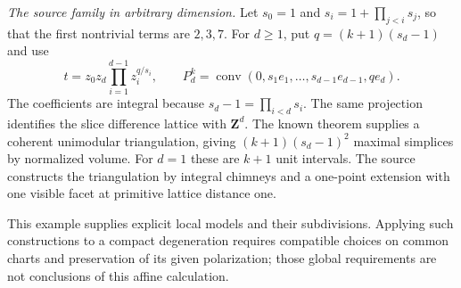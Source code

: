 \begin{example}
\emph{The source family in arbitrary dimension.}
Let $s_0=1$ and $s_i=1+\prod_{j<i}s_j$, so that the first nontrivial
terms are $2,3,7$. For $d\ge1$, put $q=(k+1)(s_d-1)$ and use
\[
          t=z_0z_d\prod_{i=1}^{d-1}z_i^{q/s_i},
 \qquad
 P_d^k=\operatorname{conv}
   (0,s_1e_1,\ldots,s_{d-1}e_{d-1},qe_d).
\]
The coefficients are integral because $s_d-1=\prod_{i<d}s_i$.
The same projection identifies the slice difference lattice with
$\mathbf Z^d$. The known theorem supplies a coherent unimodular
triangulation, giving $(k+1)(s_d-1)^2$ maximal simplices by normalized
volume. For $d=1$ these are $k+1$ unit intervals. The source constructs
the triangulation by integral chimneys and a one-point extension
with one visible facet at primitive lattice distance one.

This example supplies explicit local models and their subdivisions.
Applying such constructions to a compact degeneration requires compatible
choices on common charts and preservation of its given polarization;
those global requirements are not conclusions of this affine calculation.
\end{example}


